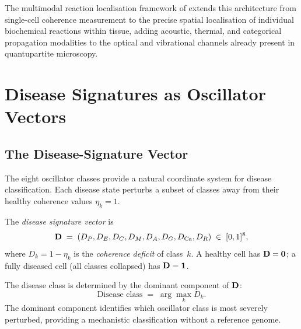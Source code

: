 \begin{remark}
The multimodal reaction localisation framework of 
extends this architecture from single-cell coherence measurement to the
precise spatial localisation of individual biochemical reactions within tissue,
adding acoustic, thermal, and categorical propagation modalities to the
optical and vibrational channels already present in quantupartite microscopy.
\end{remark}

\section{Disease Signatures as Oscillator Vectors}
\label{sec:disease-vectors}

\subsection{The Disease-Signature Vector}

The eight oscillator classes provide a natural coordinate system for disease
classification.  Each disease state perturbs a subset of classes away from
their healthy coherence values $\eta_k = 1$.

\begin{definition}
\label{def:disease-vector}
The \emph{disease signature vector} is
\begin{equation}
    \mathbf{D} \;=\; (D_P, D_E, D_C, D_M, D_A, D_G, D_\mathrm{Ca}, D_R)
    \;\in\; [0,1]^8,
\end{equation}
where $D_k = 1 - \eta_k$ is the \emph{coherence deficit} of class~$k$.
A healthy cell has $\mathbf{D} = \mathbf{0}$; a fully diseased cell (all classes
collapsed) has $\mathbf{D} = \mathbf{1}$.
\end{definition}

\begin{proposition}
\label{prop:disease-class}
The disease class is determined by the dominant component of $\mathbf{D}$:
\begin{equation}
    \text{Disease class} \;=\; \arg\max_k D_k.
\end{equation}
The dominant component identifies which oscillator class is most severely
perturbed, providing a mechanistic classification without a reference genome.
\end{proposition}

